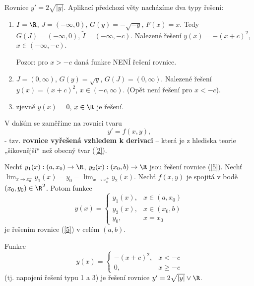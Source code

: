 \begin{priklad}
Rovnice $y' = 2\sqrt{|y|}$. Aplikací předchozí věty nacházíme dva typy řešení:

\begin{enumerate}[label=\textup{1. typ:}]
    \item $I = \R$, $J = (-\infty, 0)$, $G(y) = -\sqrt{-y}$, $F(x) = x$. Tedy $G(J) = (-\infty, 0)$, $\tilde{I} = (-\infty, -c)$. Nalezené řešení $y(x) = -(x + c)^2$, $x \in (-\infty, -c)$.

    Pozor: pro $x > -c$ daná funkce NENÍ řešení rovnice.

    \item $J = (0, \infty)$, $G(y) = \sqrt{y}$, $G(J) = (0, \infty)$. Nalezené řešení $y(x) = (x + c)^2$, $x \in (-c, \infty)$. (Opět není řešení pro $x < -c$).

    \item zjevně $y(x) = 0$, $x \in \R$ je řešení.
\end{enumerate}
\end{priklad}

\begin{poznamka}
V dalším se zaměříme na rovnici tvaru
\begin{equation}\label{5}
y' = f(x, y),
\end{equation}
- tzv. \textbf{rovnice vyřešená vzhledem k derivaci} – která je z hlediska teorie „šikovnější“ než obecný tvar (\ref{2}).
\end{poznamka}

\begin{lemma}[O napojování]
Nechť $y_1(x): (a, x_0) \to \R$, $y_2(x): (x_0, b) \to \R$ jsou řešení rovnice (\ref{5}). Nechť $\lim_{x \to x_0^-} y_1(x) = y_0 = \lim_{x \to x_0^+} y_2(x)$. Nechť $f(x, y)$ je spojitá v bodě $(x_0, y_0) \in \R^2$. Potom funkce
\[
y(x) = \begin{cases}
y_1(x), & x \in (a, x_0) \\
y_2(x), & x \in (x_0, b) \\
y_0, & x = x_0
\end{cases}
\]
je řešením rovnice (\ref{5}) v celém $(a, b)$.
\end{lemma}

\begin{priklad}
Funkce
\[
y(x) = \begin{cases}
-(x + c)^2, & x < -c \\
0, & x \geq -c
\end{cases}
\]
(tj. napojení řešení typu 1 a 3) je řešení rovnice $y' = 2\sqrt{|y|} \vee \R$.
\end{priklad}

